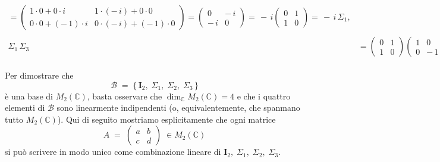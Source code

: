 \documentclass{article}
\theoremstyle{plain}
\theoremstyle{definition}
\theoremstyle{remark}
\begin{document}
\begin{enumerate}
\begin{align*}
            =
            \begin{pmatrix}
            1\cdot 0 + 0\cdot i & 1\cdot(-\,i) + 0\cdot 0 \\[6pt]
            0\cdot 0 + (-\,1)\cdot i & 0\cdot(-\,i) + (-\,1)\cdot 0
            \end{pmatrix}
            =
            \begin{pmatrix} 0 & -\,i \\[4pt] -\,i & 0 \end{pmatrix}
            =\,-\,i
            \begin{pmatrix} 0 & 1 \\[4pt] 1 & 0 \end{pmatrix}
            =\,-\,i\,\Sigma_1, \\[1em]
            \Sigma_1\,\Sigma_3
            &=
            \begin{pmatrix} 0 & 1 \\[4pt] 1 & 0 \end{pmatrix}
            \begin{pmatrix} 1 & 0 \\[4pt] 0 & -\,1 \end{pmatrix}
            =
            \begin{pmatrix}
            0\cdot 1 + 1\cdot 0 & 0\cdot 0 + 1\cdot(-\,1) \\[6pt]
            1\cdot 1 + 0\cdot 0 & 1\cdot 0 + 0\cdot(-\,1)
            \end{pmatrix}
            =
            \begin{pmatrix} 0 & -\,1 \\[4pt] 1 & 0 \end{pmatrix}
            =\,-\,i
            \begin{pmatrix} 0 & -\,i \\[4pt] i & 0 \end{pmatrix}
            =\,-\,i\,\Sigma_2.
        \end{align*}
\end{enumerate}
Per dimostrare che 
\[
\mathcal{B} \;=\; \{\,\mathbf{I}_2,\;\Sigma_1,\;\Sigma_2,\;\Sigma_3\,\}
\]
è una base di \(M_2(\mathbb{C})\), basta osservare che \(\dim_{\mathbb{C}} M_2(\mathbb{C})=4\) e che i quattro elementi di \(\mathcal{B}\) sono linearmente indipendenti (o, equivalentemente, che span\-mano tutto \(M_2(\mathbb{C})\)). Qui di seguito mostriamo esplicitamente che ogni matrice 
\[
A \;=\; \begin{pmatrix} a & b \\ c & d \end{pmatrix}
\;\in M_2(\mathbb{C})
\]
si può scrivere in modo unico come combinazione lineare di \(\mathbf{I}_2,\;\Sigma_1,\;\Sigma_2,\;\Sigma_3\).
\end{document}
